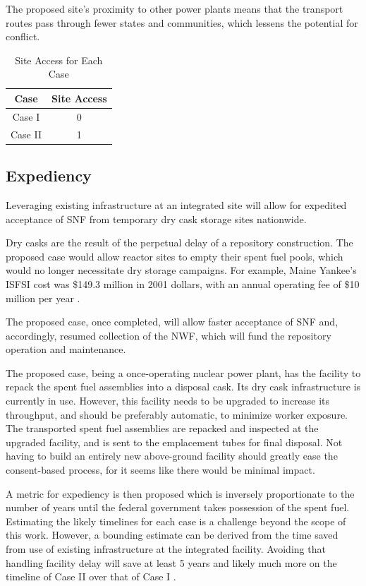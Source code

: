 The proposed site's proximity to other power plants means that the transport
routes pass through fewer states and communities, which lessens the potential 
for conflict.


\begin{table}[h]
	\centering
        \caption {Site Access for Each Case}
		\begin{tabular}{|c|c|}
			\hline
			Case & Site Access \\
			\hline
			Case I & 0 \\
			Case II & 1 \\
			\hline
                \end{tabular}
\end{table}



\subsection{Expediency}

Leveraging existing infrastructure at an integrated site will allow for 
expedited acceptance of \gls{SNF} from temporary dry cask storage sites 
nationwide.

Dry casks are the result of the perpetual delay of a repository construction.
The proposed case would allow reactor sites to empty their spent fuel pools, which
would no longer necessitate dry storage campaigns. For example, Maine Yankee's 
\gls{ISFSI} cost was \$149.3 million in 2001 dollars, with an annual operating fee
of \$10 million per year \cite{lee_costing_2009}. 

The proposed case, once completed, will allow faster acceptance of \gls{SNF} and, 
accordingly, resumed collection of the \gls{NWF}, 
which will fund the repository operation and maintenance.

The proposed case, being a once-operating nuclear power plant, has the facility to 
repack the spent fuel assemblies into a disposal cask. Its dry cask infrastructure 
is currently in use. However, this facility needs to be upgraded to increase its throughput, and should be preferably automatic, to minimize worker exposure. The transported spent fuel assemblies are repacked and inspected at the upgraded facility, and is sent to the emplacement tubes for final disposal. Not having to build an entirely new above-ground facility should greatly ease the consent-based process, for it seems like there would be minimal impact. 
 
A metric for expediency is then proposed which is inversely proportionate to 
the number of years until the federal government takes possession of the spent 
fuel. Estimating the likely timelines for each case is a challenge beyond the 
scope of this work. However, a bounding estimate can be derived from the time 
saved from use of existing infrastructure at the integrated facility. Avoiding 
that handling facility delay will save at least 5 years 
and likely much more on the timeline of Case II over that of Case I 
\cite{doe_strategy_2013}. 

